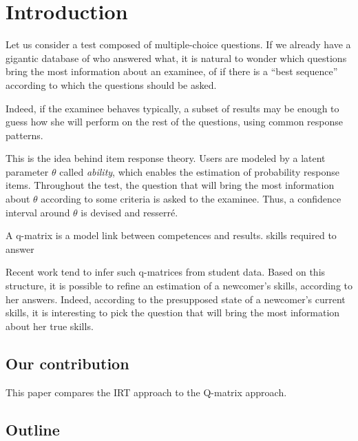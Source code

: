\documentclass{sig-alternate}
\begin{document}



\section{Introduction}

Let us consider a test composed of multiple-choice questions. If we already have a gigantic database of who answered what, it is natural to wonder which questions bring the most information about an examinee, of if there is a ``best sequence'' according to which the questions should be asked. %

Indeed, if the examinee behaves typically, a subset of results may be enough to guess how she will perform on the rest of the questions, using common response patterns.

This is the idea behind item response theory. Users are modeled by a latent parameter $\theta$ called \emph{ability}, which enables the estimation of probability response items. %
Throughout the test, the question that will bring the most information about $\theta$ according to some criteria is asked to the examinee. Thus, a confidence interval around $\theta$ is devised and resserré. %

A q-matrix is a model link between competences and results. skills required to answer

Recent work tend to infer such q-matrices from student data. Based on this structure, it is possible to refine an estimation of a newcomer's skills, according to her answers. Indeed, according to the presupposed state of a newcomer's current skills, it is interesting to pick the question that will bring the most information about her true skills.

\subsection{Our contribution}

This paper compares the IRT approach to the Q-matrix approach.

\subsection{Outline}
\end{document}
